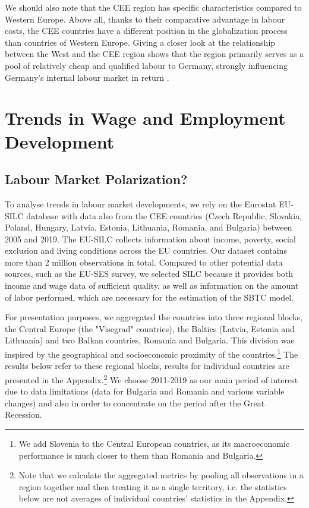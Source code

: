 \documentclass[11pt]{article}
\begin{document}
We should also note that the CEE region has specific characteristics compared to Western Europe. Above all, thanks to their comparative advantage in labour costs, the CEE countries have a different position in the globalization process than countries of Western Europe. Giving a closer look at the relationship between the West and the CEE region shows that the region primarily serves as a pool of relatively cheap and qualified labour to Germany, strongly influencing Germany's internal labour market in return 
\citep{marin2004nation, marin2018global}. 


\section{Trends in Wage and Employment Development}
\subsection{Labour Market Polarization?}\label{wage_analysis}
To analyse trends in labour market developments, we rely on the Eurostat EU-SILC database with data also from the CEE countries (Czech Republic, Slovakia, Poland, Hungary, Latvia, Estonia, Lithuania, Romania, and Bulgaria) between 2005 and 2019. The EU-SILC collects information about income, poverty, social exclusion and living conditions across the EU countries. Our dataset contains more than 2 million observations in total.
Compared to other potential data sources, such as the EU-SES survey, we selected SILC because it provides both income and wage data of sufficient quality, as well as information on the amount of labor performed, which are necessary for the estimation of the SBTC model. 

For presentation purposes, we aggregated the countries into three regional blocks, the Central Europe (the "Visegrad" countries), the Baltics (Latvia, Estonia and Lithuania) and two Balkan countries, Romania and Bulgaria. This division was inspired by the geographical and socioeconomic proximity of the countries.\footnote{We add Slovenia to the Central European countries, as its macroeconomic performance is much closer to them than Romania and Bulgaria.} The results below refer to these regional blocks, results for individual countries are presented in the Appendix.\footnote{Note that we calculate the aggregated metrics by pooling all observations in a region together and then treating it as a single territory, i.e. the statistics below are not averages of individual countries' statistics in the Appendix.} We choose 2011-2019 as our main period of interest due to data limitations (data for Bulgaria and Romania and various variable changes) and also in order to concentrate on the period after the Great Recession.
\end{document}
